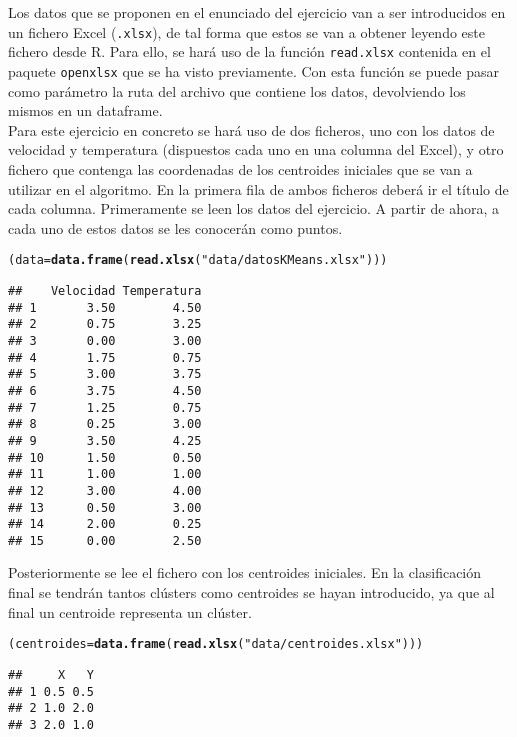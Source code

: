 \documentclass[12pt]{report}\usepackage[]{graphicx}\usepackage[dvipsnames]{xcolor}
\makeatletter
\newcommand{\hlstr}[1]{\textcolor[rgb]{0.192,0.494,0.8}{#1}}%
\newcommand{\hlstd}[1]{\textcolor[rgb]{0.345,0.345,0.345}{#1}}%
\newcommand{\hlkwb}[1]{\textcolor[rgb]{0.69,0.353,0.396}{#1}}%
\newcommand{\hlkwd}[1]{\textcolor[rgb]{0.737,0.353,0.396}{\textbf{#1}}}%
\newenvironment{kframe}{%
 \def\at@end@of@kframe{}%
 \ifinner\ifhmode%
  \def\at@end@of@kframe{\end{minipage}}%
  \begin{minipage}{\columnwidth}%
 \fi\fi%
 \def\FrameCommand##1{\hskip\@totalleftmargin \hskip-\fboxsep
 \colorbox{shadecolor}{##1}\hskip-\fboxsep
     \hskip-\linewidth \hskip-\@totalleftmargin \hskip\columnwidth}%
 \MakeFramed {\advance\hsize-\width
   \@totalleftmargin\z@ \linewidth\hsize
   \@setminipage}}%
 {\par\unskip\endMakeFramed%
 \at@end@of@kframe}
\newenvironment{knitrout}{}{} %
\makeatother
\begin{document}
				 Los datos que se proponen en el enunciado del ejercicio van a ser introducidos en un fichero Excel (\texttt{.xlsx}), de tal forma que estos se van a obtener leyendo este fichero desde R. Para ello, se hará uso de la función \texttt{read.xlsx} contenida en el paquete \texttt{openxlsx} que se ha visto previamente. Con esta función se puede pasar como parámetro la ruta del archivo que contiene los datos, devolviendo los mismos en un dataframe.\\
				 
				 Para este ejercicio en concreto se hará uso de dos ficheros, uno con los datos de velocidad y temperatura (dispuestos cada uno en una columna del Excel), y otro fichero que contenga las coordenadas de los centroides iniciales que se van a utilizar en el algoritmo. En la primera fila de ambos ficheros deberá ir el título de cada columna. Primeramente se leen los datos del ejercicio. A partir de ahora, a cada uno de estos datos se les conocerán como puntos.
				 
\begin{knitrout}
\color{fgcolor}\begin{kframe}
\begin{alltt}
\hlstd{(data} \hlkwb{=} \hlkwd{data.frame}\hlstd{(}\hlkwd{read.xlsx}\hlstd{(}\hlstr{"data/datosKMeans.xlsx"}\hlstd{)))}
\end{alltt}
\begin{verbatim}
##    Velocidad Temperatura
## 1       3.50        4.50
## 2       0.75        3.25
## 3       0.00        3.00
## 4       1.75        0.75
## 5       3.00        3.75
## 6       3.75        4.50
## 7       1.25        0.75
## 8       0.25        3.00
## 9       3.50        4.25
## 10      1.50        0.50
## 11      1.00        1.00
## 12      3.00        4.00
## 13      0.50        3.00
## 14      2.00        0.25
## 15      0.00        2.50
\end{verbatim}
\end{kframe}
\end{knitrout}
				 
				 Posteriormente se lee el fichero con los centroides iniciales. En la clasificación final se tendrán tantos clústers como centroides se hayan introducido, ya que al final un centroide representa un clúster.
				 
\begin{knitrout}
\color{fgcolor}\begin{kframe}
\begin{alltt}
\hlstd{(centroides} \hlkwb{=} \hlkwd{data.frame}\hlstd{(}\hlkwd{read.xlsx}\hlstd{(}\hlstr{"data/centroides.xlsx"}\hlstd{)))}
\end{alltt}
\begin{verbatim}
##     X   Y
## 1 0.5 0.5
## 2 1.0 2.0
## 3 2.0 1.0
\end{verbatim}
\end{kframe}
\end{knitrout}
				 
\end{document}
